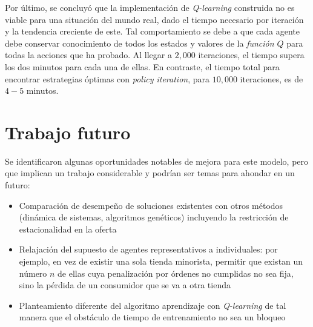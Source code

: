 Por \'ultimo, se concluy\'o que la implementaci\'on de \textit{Q-learning} construida no es viable para una situaci\'on del mundo real, dado el tiempo necesario por iteraci\'on y la tendencia creciente de este. Tal comportamiento se debe a que cada agente debe conservar conocimiento de todos los estados y valores de la \textit{funci\'on $Q$} para todas la acciones que ha probado. Al llegar a $2,000$ iteraciones, el tiempo supera los dos minutos para cada una de ellas. En contraste, el tiempo total para encontrar estrategias \'optimas con \textit{policy iteration}, para $10,000$ iteraciones, es de $4-5$ minutos. 


\section{Trabajo futuro}

Se identificaron algunas oportunidades notables de mejora para este modelo, pero que implican un trabajo considerable y podr\'ian ser temas para ahondar en un futuro:

\begin{itemize}
    \item Comparaci\'on de desempe\~no de soluciones existentes con otros m\'etodos (din\'amica de sistemas, algoritmos gen\'eticos) incluyendo la restricci\'on de estacionalidad en la oferta
    \item Relajaci\'on del supuesto de agentes representativos a individuales: por ejemplo, en vez de existir una sola tienda minorista, permitir que existan un n\'umero $n$ de ellas cuya penalizaci\'on por \'ordenes no cumplidas no sea fija, sino la p\'erdida de un consumidor que se va a otra tienda
    \item Planteamiento diferente del algoritmo aprendizaje con \textit{Q-learning} de tal manera que el obst\'aculo de tiempo de entrenamiento no sea un bloqueo
\end{itemize}


